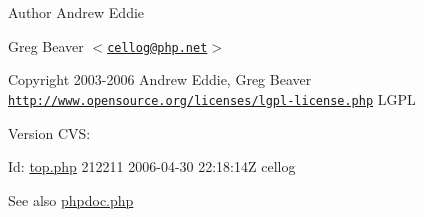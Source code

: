 \begin{DoxyAuthor}{\-Author}
\-Andrew \-Eddie 

\-Greg \-Beaver $<$\href{mailto:cellog@php.net}{\tt cellog@php.\-net}$>$ 
\end{DoxyAuthor}
\begin{DoxyCopyright}{\-Copyright}
2003-\/2006 \-Andrew \-Eddie, \-Greg \-Beaver  \href{http://www.opensource.org/licenses/lgpl-license.php}{\tt http\-://www.\-opensource.\-org/licenses/lgpl-\/license.\-php} \-L\-G\-P\-L 
\end{DoxyCopyright}
\begin{DoxyVersion}{\-Version}
\-C\-V\-S\-: 
\end{DoxyVersion}
\begin{DoxyParagraph}{\-Id\-:}
\hyperlink{top_8php}{top.\-php} 212211 2006-\/04-\/30 22\-:18\-:14\-Z cellog 
\end{DoxyParagraph}
\begin{DoxySeeAlso}{\-See also}
\hyperlink{phpdoc_8php}{phpdoc.\-php}
\end{DoxySeeAlso}
